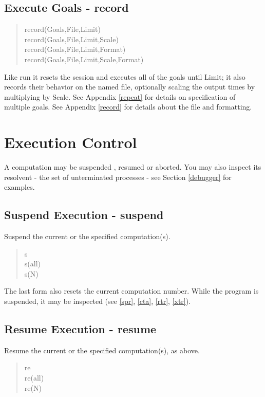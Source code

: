 \subsection{Execute Goals - record}
\label{recorders}
\begin{verse}
    record(Goals,File,Limit) \\
    record(Goals,File,Limit,Scale) \\
    record(Goals,File,Limit,Format) \\
    record(Goals,File,Limit,Scale,Format)
\end{verse}

\noindent
Like run it resets the session and
executes all of the goals until Limit; it also records their behavior
on the named file, optionally scaling the output times by multiplying
by Scale.  See  Appendix \ref{repeat} for
details on specification of multiple goals.  See  Appendix 
\ref{record} for details about the file and formatting.

\section{Execution Control}
\noindent
A computation may be  suspended ,  resumed  or  aborted.  You may also
inspect its resolvent - the set of unterminated processes  - see
Section \ref{debugger} for examples.

\subsection{Suspend Execution - suspend}
\label{suspend}

Suspend the current or the specified computation(s).

\begin{verse}
    s \\
    s(all) \\
    s(N)
\end{verse}

\noindent
The last form also resets the current computation number.
While the program is suspended, it may be inspected (see
\ref{spr}, \ref{cta}, \ref{rtr}, \ref{xtr}).

\subsection{Resume Execution - resume}
\label{resume}
Resume the current or the specified computation(s), as above.

\begin{verse}
    re \\
    re(all) \\
    re(N)
\end{verse}

